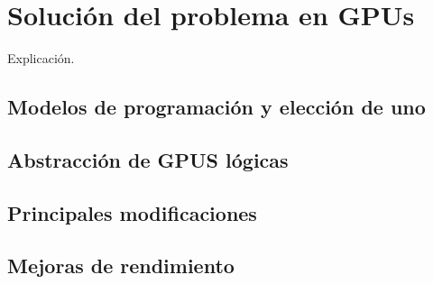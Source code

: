 
\chapter{Solución del problema en GPUs\label{chapSolucionDelProblemaEnGPUS}}

Explicación.

\section{Modelos de programación y elección de uno}
\section{Abstracción de GPUS lógicas}
\section{Principales modificaciones}
\section{Mejoras de rendimiento}



\newpage
